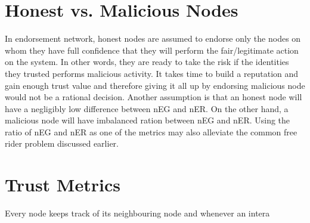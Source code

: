 







\section{Honest vs. Malicious Nodes}
In endorsement network, honest nodes are assumed to endorse only the
nodes on whom they have full confidence that they will perform the
fair/legitimate action on the system. In other words, they are ready
to take the risk if the identities they trusted performs malicious
activity. It takes time to build a reputation and gain enough trust value
and therefore giving it all up by endorsing malicious node would not
be a rational decision. Another assumption is that an honest node will
have a negligibly low difference between nEG and nER. On the other hand,
a malicious node will have imbalanced ration between nEG and nER. Using
the ratio of nEG and nER as one of the metrics may also alleviate the
common free rider problem discussed earlier.

\section{Trust Metrics}
Every node keeps track of its neighbouring node and whenever an intera






